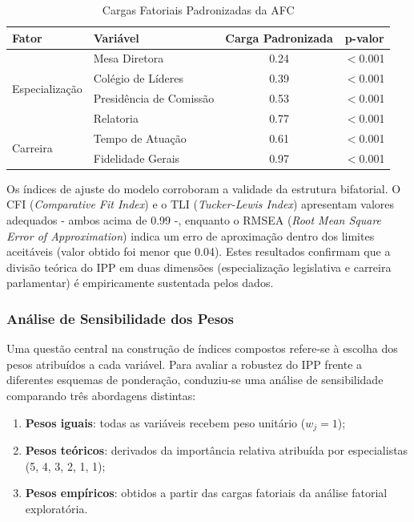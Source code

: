 \begin{table}[h!]
\centering
\caption{Cargas Fatoriais Padronizadas da AFC}
\label{tab:cfa_loadings}
\begin{tabular}{llcc}
\hline
\textbf{Fator} & \textbf{Variável} & \textbf{Carga Padronizada} & \textbf{p-valor} \\
\hline
\multirow{4}{*}{Especialização} & Mesa Diretora & 0.24 & $<$0.001 \\
& Colégio de Líderes & 0.39 & $<$0.001 \\
& Presidência de Comissão & 0.53 & $<$0.001 \\
& Relatoria & 0.77 & $<$0.001 \\
\hline
\multirow{3}{*}{Carreira} & Tempo de Atuação & 0.61 & $<$0.001 \\
& Fidelidade Gerais & 0.97 & $<$0.001 \\
\hline
\end{tabular}
\end{table}

Os índices de ajuste do modelo corroboram a validade da estrutura bifatorial. O CFI (\textit{Comparative Fit Index}) e o TLI (\textit{Tucker-Lewis Index}) apresentam valores adequados - ambos acima de 0.99 -, enquanto o RMSEA (\textit{Root Mean Square Error of Approximation}) indica um erro de aproximação dentro dos limites aceitáveis (valor obtido foi menor que 0.04). Estes resultados confirmam que a divisão teórica do IPP em duas dimensões (especialização legislativa e carreira parlamentar) é empiricamente sustentada pelos dados.

\subsubsection{Análise de Sensibilidade dos Pesos}

Uma questão central na construção de índices compostos refere-se à escolha dos pesos atribuídos a cada variável. Para avaliar a robustez do IPP frente a diferentes esquemas de ponderação, conduziu-se uma análise de sensibilidade comparando três abordagens distintas:

\begin{enumerate}
    \item \textbf{Pesos iguais}: todas as variáveis recebem peso unitário ($w_j = 1$);
    \item \textbf{Pesos teóricos}: derivados da importância relativa atribuída por especialistas (5, 4, 3, 2, 1, 1);
    \item \textbf{Pesos empíricos}: obtidos a partir das cargas fatoriais da análise fatorial exploratória.
\end{enumerate}

